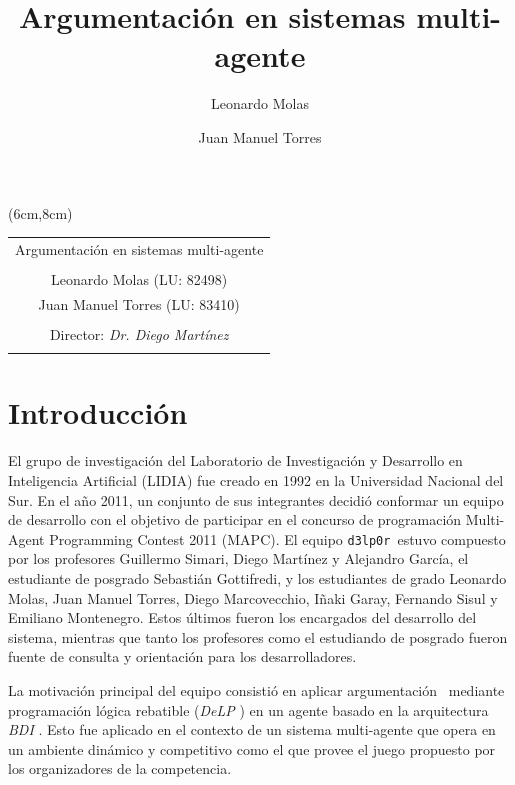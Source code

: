 \documentclass[oneside]{book}
\title{Argumentación en sistemas multi-agente} %
\author{Leonardo Molas \and Juan Manuel Torres}
\theoremstyle{definition}
\newcommand{\DLP}{\mbox{\textit{DeLP}}}
\begin{document}


\thispagestyle{empty}

\begin{textblock*}{10cm} (6cm,8cm) %
\begin{center}
\begin{tabular}{c}
{\LARGE Argumentación en sistemas multi-agente} \\
\\
Leonardo Molas (LU: 82498)\\
Juan Manuel Torres (LU: 83410)\\
\\
Director: \emph{Dr. Diego Martínez}\\
\\
\end{tabular}
\end{center}
\end{textblock*}
\null
\vfill
\pagebreak
\thispagestyle{empty}

\setcounter{page}{1}


\tableofcontents

\chapter*{Introducción}


El grupo de investigación del Laboratorio de Investigación y Desarrollo en 
Inteligencia Artificial (LIDIA) fue creado en 1992 en la Universidad Nacional 
del Sur. En el año 2011, un conjunto de sus integrantes decidió conformar un 
equipo de desarrollo con el objetivo de participar en el concurso de programación 
Multi-Agent Programming Contest 2011 (MAPC). El equipo \texttt{d3lp0r}\ estuvo compuesto
por los profesores Guillermo Simari, Diego Martínez y Alejandro García, el estudiante
de posgrado Sebastián Gottifredi, y los estudiantes de grado Leonardo Molas, 
Juan Manuel Torres, Diego Marcovecchio, Iñaki Garay, Fernando Sisul y Emiliano Montenegro.
Estos últimos fueron los encargados del desarrollo del sistema, mientras que tanto
los profesores como el estudiando de posgrado fueron fuente de consulta y orientación
para los desarrolladores.
	
La motivación principal del equipo consistió en aplicar argumentación \cite{Prakken:1997} 
\cite{Rahwan:2009} \cite{Bench-Capon:2007}\ mediante programación lógica rebatible (\DLP
\cite{Garcia:2004a}) en un agente basado en la arquitectura \textit{BDI} \cite{Amgoud:2008}. Esto
fue aplicado en el contexto de un sistema multi-agente que opera en un ambiente dinámico
y competitivo como el que provee el juego propuesto por los organizadores de la competencia. 
	
\end{document}
